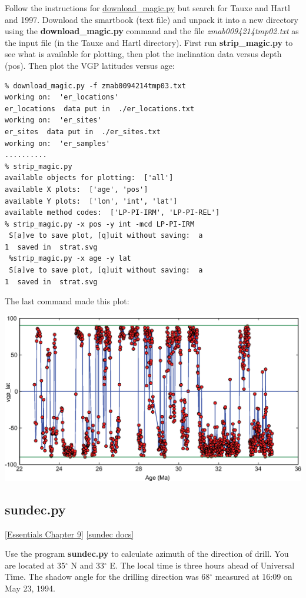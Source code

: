 \documentclass[11pt]{book}
\begin{document}
{Follow the instructions for \href{#download_magic.py}{download\_magic.py} but search for Tauxe and Hartl and 1997.  Download the smartbook (text file) and unpack it into a new directory using the {\bf download\_magic.py} command and the file {\it zmab0094214tmp02.txt} as the input file (in the Tauxe and Hartl directory).   First run {\bf strip\_magic.py} to see what is available for plotting, then
plot the inclination data versus depth (pos).  Then plot the VGP latitudes versus age:
\begin{verbatim}
% download_magic.py -f zmab0094214tmp03.txt
working on:  'er_locations'
er_locations  data put in  ./er_locations.txt
working on:  'er_sites'
er_sites  data put in  ./er_sites.txt
working on:  'er_samples'
..........
% strip_magic.py
available objects for plotting:  ['all']
available X plots:  ['age', 'pos']
available Y plots:  ['lon', 'int', 'lat']
available method codes:  ['LP-PI-IRM', 'LP-PI-REL']
% strip_magic.py -x pos -y int -mcd LP-PI-IRM
 S[a]ve to save plot, [q]uit without saving:  a
1  saved in  strat.svg
 %strip_magic.py -x age -y lat
 S[a]ve to save plot, [q]uit without saving:  a
1  saved in  strat.svg
\end{verbatim}
The last command made this plot:


\includegraphics[width=15cm]{EPSfiles/latVage.eps}



\subsection{sundec.py}
\href{http://earthref.org/MAGIC/books/Tauxe/Essentials/WebBook3ch9.html#ch9}{[Essentials Chapter 9]}
\href{https://github.com/PmagPy/PmagPy/blob/master/programs/sundec.py}{[sundec docs]}

Use the program {\bf sundec.py} to calculate
azimuth of the direction of drill. You are located at 35$^{\circ}$ N and 33$^{\circ}$ E.  The local
time is three hours ahead of Universal Time.  The shadow angle for the
drilling direction was 68$^{\circ}$ measured at 16:09 on May 23, 1994.

}
\end{document}
